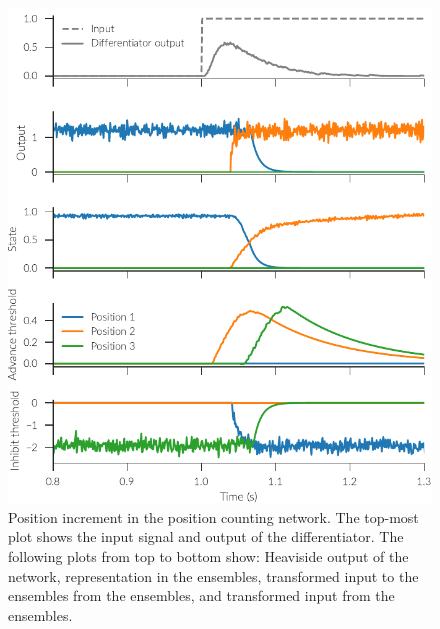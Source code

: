 \begin{figure}
    \centering
    \includegraphics{figures/pos-example}
    \caption[Position increment in the position counting network.]{Position increment in the position counting network. The top-most plot shows the input signal and output of the differentiator. The following plots from top to bottom show: Heaviside output of the network, representation in the  ensembles, transformed input to the  ensembles from the  ensembles, and transformed input from the  ensembles.}\label{fig:pos-example}
\end{figure}
